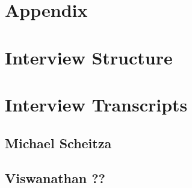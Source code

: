 \begin{appendix}
\section*{Appendix}
\label{Appendix}	
\tocless\section{Interview Structure}

\tocless\section{Interview Transcripts}

\tocless\subsection{Michael Scheitza}

\tocless\subsection{Viswanathan ??}
	
	
\end{appendix}	